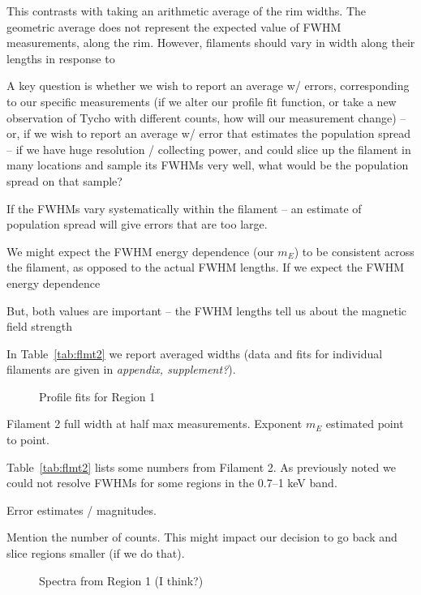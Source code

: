 \documentclass[12pt,preprint]{aastex}  %
\begin{document}
This contrasts with taking an arithmetic average of the rim widths.  The
geometric average does not represent the expected value of FWHM measurements,
along the rim.  However, filaments should vary in width along their lengths in
response to


A key question is whether we wish to report an average w/ errors, corresponding
to our specific measurements (if we alter our profile fit function, or take a
new observation of Tycho with different counts, how will our measurement
change) -- or, if we wish to report an average w/ error that estimates the
population spread -- if we have huge resolution / collecting power, and could
slice up the filament in many locations and sample its FWHMs very well, what
would be the population spread on that sample?


If the FWHMs vary systematically within the filament -- an estimate of
population spread will give errors that are too large.

We might expect the FWHM energy dependence (our $m_E$) to be consistent across
the filament, as opposed to the actual FWHM lengths.
If we expect the FWHM energy dependence


But, both values are important -- the FWHM lengths tell us about the magnetic
field strength


In Table~\ref{tab:flmt2} we report averaged widths (data and fits for
individual filaments are given in \emph{appendix, supplement?}).


\begin{figure}
    \caption{Profile fits for Region 1}
    \label{fig:profiles}
\end{figure}


\begin{table*}
\scriptsize
\centering
\caption{Filament 2 full width at half max measurements.
Exponent $m_E$ estimated point to point.\label{tab:flmt2}}

\end{table*}

Table~\ref{tab:flmt2} lists some numbers from Filament 2.  As previously noted
we could not resolve FWHMs for some regions in the 0.7--1 keV band.

Error estimates / magnitudes.

Mention the number of counts.  This might impact our decision to go back and
slice regions smaller (if we do that).

\begin{figure}
    \caption{Spectra from Region 1 (I think?)}
    \label{fig:spec}
\end{figure}
\end{document}
